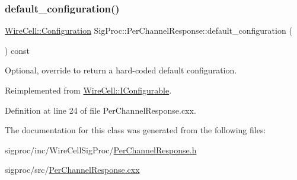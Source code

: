 \subsubsection{\texorpdfstring{default\+\_\+configuration()}{default\_configuration()}}
{\footnotesize\ttfamily \hyperlink{namespace_wire_cell_a9f705541fc1d46c608b3d32c182333ee}{Wire\+Cell\+::\+Configuration} Sig\+Proc\+::\+Per\+Channel\+Response\+::default\+\_\+configuration (\begin{DoxyParamCaption}{ }\end{DoxyParamCaption}) const\hspace{0.3cm}{\ttfamily [virtual]}}



Optional, override to return a hard-\/coded default configuration. 



Reimplemented from \hyperlink{class_wire_cell_1_1_i_configurable_a54841b2da3d1ea02189478bff96f7998}{Wire\+Cell\+::\+I\+Configurable}.



Definition at line 24 of file Per\+Channel\+Response.\+cxx.



The documentation for this class was generated from the following files\+:\begin{DoxyCompactItemize}
\item 
sigproc/inc/\+Wire\+Cell\+Sig\+Proc/\hyperlink{_per_channel_response_8h}{Per\+Channel\+Response.\+h}\item 
sigproc/src/\hyperlink{_per_channel_response_8cxx}{Per\+Channel\+Response.\+cxx}\end{DoxyCompactItemize}
